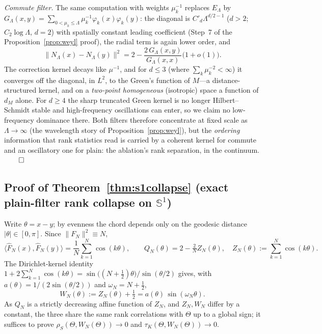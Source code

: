 \documentclass[11pt]{article}
\theoremstyle{remark}
\begin{document}
\emph{Commute filter.} The same computation with weights $\mu_k^{-1}$ replaces
$E_\Lambda$ by $G_\Lambda(x,y)=\sum_{0<\mu_k\le\Lambda}\mu_k^{-1}
\varphi_k(x)\varphi_k(y)$: the diagonal is $C'_d\Lambda^{d/2-1}$ ($d>2$;
$C_2\log\Lambda$, $d=2$) with spatially constant leading coefficient
(Step~7 of the Proposition~\ref{prop:weyl} proof), the radial term is again
lower order, and
\[
\big\lVert N_\Lambda(x)-N_\Lambda(y)\big\rVert^2
=2-\frac{2\,G_\Lambda(x,y)}{G_\Lambda(x,x)}\big(1+o(1)\big).
\]
The correction kernel decays like $\mu^{-1}$, and for $d\le3$ (where
$\sum_k\mu_k^{-2}<\infty$) it converges off the diagonal, in $L^2$, to the Green's
function of $M$---a distance-structured kernel, and on a \emph{two-point
homogeneous} (isotropic) space a function of $d_M$ alone. For $d\ge4$ the sharp
truncated Green kernel is no longer Hilbert--Schmidt stable and high-frequency
oscillations can enter, so we claim no low-frequency dominance there. Both filters
therefore concentrate at fixed scale as $\Lambda\to\infty$ (the wavelength
story of Proposition~\ref{prop:weyl}), but the \emph{ordering} information
that rank statistics read is carried by a coherent kernel for commute and an
oscillatory one for plain: the ablation's rank separation, in the continuum.
\hfill$\qed$

\subsection*{Proof of Theorem~\ref{thm:s1collapse} (exact plain-filter rank collapse on $\mathbb S^1$)}
Write $\theta=x-y$; by evenness the chord depends only on the geodesic distance
$\lvert\theta\rvert\in[0,\pi]$. Since $\lVert F_N\rVert^2\equiv N$,
\[
\big\langle \widehat F_N(x),\widehat F_N(y)\big\rangle
=\frac1N\sum_{k=1}^N\cos(k\theta),
\qquad
Q_N(\theta)=2-\tfrac2N Z_N(\theta),\quad
Z_N(\theta):=\sum_{k=1}^N\cos(k\theta).
\]
The Dirichlet-kernel identity $1+2\sum_{k=1}^N\cos(k\theta)
=\sin\!\big((N+\tfrac12)\theta\big)/\sin(\theta/2)$ gives, with
$a(\theta)=1/(2\sin(\theta/2))$ and $\omega_N=N+\tfrac12$,
\[
W_N(\theta):=Z_N(\theta)+\tfrac12=a(\theta)\,\sin(\omega_N\theta).
\]
As $Q_N$ is a strictly decreasing affine function of $Z_N$, and $Z_N,W_N$ differ
by a constant, the three share the same rank correlations with $\Theta$ up to a
global sign; it suffices to prove $\rho_S(\Theta,W_N(\Theta))\to0$ and
$\tau_K(\Theta,W_N(\Theta))\to0$.
\end{document}
